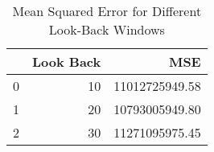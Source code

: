 \begin{table}
    \caption{Mean Squared Error for Different Look-Back Windows}
    \label{tab:mse_results}
    \begin{tabular}{lrr}
        \toprule
        & Look Back & MSE \\
        \midrule
        0 & 10 & 11012725949.58 \\
        1 & 20 & 10793005949.80 \\
        2 & 30 & 11271095975.45 \\
        \bottomrule
    \end{tabular}
\end{table}
